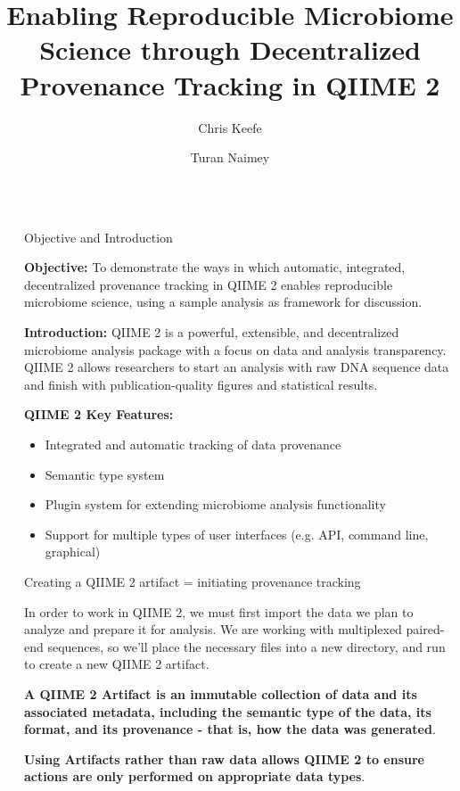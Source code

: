 \documentclass[final]{beamer}
\title{Enabling Reproducible Microbiome Science through Decentralized Provenance Tracking in QIIME 2}
\author{Chris Keefe \inst{1} \and Turan Naimey}
\institute[shortinst]{\inst{1} Northern Arizona University; Pathogen and Microbiome Institute}
\newlength{\sepwidth}
\newlength{\colwidth}
\newcommand{\separatorcolumn}{\begin{column}{\sepwidth}\end{column}}
\begin{document}
\begin{frame}[t]
\begin{columns}[t]
\separatorcolumn

\begin{column}{\colwidth}

  \begin{block}{Objective and Introduction}

    \textbf{Objective:} To demonstrate the ways in which automatic, integrated, decentralized
    provenance tracking in QIIME 2 enables reproducible microbiome science,
    using a sample analysis as framework for discussion.

    \textbf{Introduction:} QIIME 2 is a powerful, extensible, and decentralized microbiome analysis
    package with a focus on data and analysis transparency. QIIME 2 allows
    researchers to start an analysis with raw DNA sequence data and finish with
    publication-quality figures and statistical results.

    \textbf{QIIME 2 Key Features:}
    \begin{itemize}
      \item Integrated and automatic tracking of data provenance
      \item Semantic type system
      \item Plugin system for extending microbiome analysis functionality
      \item Support for multiple types of user interfaces (e.g. API, command line, graphical)
    \end{itemize}
  \end{block}

  \begin{block}{Creating a QIIME 2 artifact = initiating provenance tracking}

   In order to work in QIIME 2, we must first import the data we plan to
   analyze and prepare it for analysis.  We are working with multiplexed
   paired-end sequences, so we’ll place the necessary files into a new
   directory, and run  to create a new QIIME 2 artifact.

   \textbf{A QIIME 2  Artifact is an immutable collection of data and its associated
   metadata, including the semantic type of the data, its format, and its
   provenance - that is, how the data was generated}.

   \textbf{Using Artifacts rather than raw data allows QIIME 2 to ensure actions are only
   performed on appropriate data types}.


\end{block}
\end{column}
\end{columns}
\end{frame}
\end{document}
